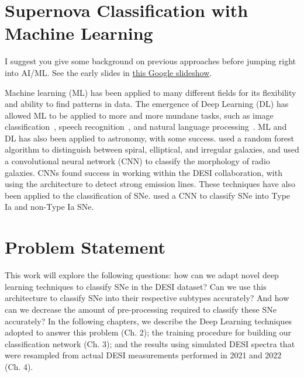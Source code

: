 \section{Supernova Classification with Machine Learning}
\label{sec:supernova-classification-with-machine-learning}


I suggest you give some background on previous approaches before jumping right into AI/ML. See the early slides in \href{https://docs.google.com/presentation/d/1zqoEVMrWbBP5k41gdjUEKioLE4J0vhu0vAzKEg4pROM/edit?usp=sharing}{this Google slideshow}.

Machine learning (ML) has been applied to many different fields for its flexibility 
and ability to find patterns in data. The emergence of Deep Learning (DL) has
allowed ML to be applied to more and more mundane tasks, such as image
classification~\parencite{krizhevsky2012}, speech recognition~\parencite{Nassif2019},
and natural language processing~\parencite{Mikolov2013}. ML and DL 
has also been applied to astronomy, with some success. \textcite{Gauci2010} used 
a random forest algorithm  to distinguish between spiral, elliptical, and irregular galaxies, 
and \textcite{Becker2021} used a convolutional neural network (CNN) to classify the morphology of
radio galaxies. CNNs found success in working within the DESI collaboration, with 
\textcite{parks2018} using the architecture to detect strong emission lines.  
These techniques have also been applied to the classification of SNe. 
\textcite{Mller2016} used a CNN to classify SNe into Type Ia and non-Type Ia SNe. 

\section{Problem Statement}
This work will explore the following questions: how can we adapt novel deep learning 
techniques to classify SNe in the DESI dataset? Can we use this architecture to 
classify SNe into their respective subtypes accurately? And how can we decrease the amount of 
pre-processing required to classify these SNe accurately? In the following chapters, we describe the Deep Learning techniques adopted to answer this problem (Ch. 2); the training procedure for building our classification network (Ch. 3); and the results using simulated DESI spectra that were resampled from actual DESI measurements performed in 2021 and 2022 (Ch. 4).
